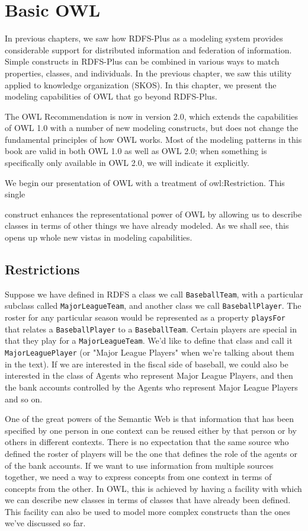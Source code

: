 \chapter{Basic OWL}
\label{ch12}

In previous chapters, we saw how RDFS-Plus as a modeling system provides
considerable support for distributed information and federation of
information. Simple constructs in RDFS-Plus can be combined in various
ways to match properties, classes, and individuals. In the previous
chapter, we saw this utility applied to knowledge organization (SKOS).
In this chapter, we present the modeling capabilities of OWL that go
beyond RDFS-Plus.

The OWL Recommendation is now in version 2.0, which extends the
capabilities of OWL 1.0 with a number of new modeling constructs, but
does not change the fundamental principles of how OWL works. Most of the
modeling patterns in this book are valid in both OWL 1.0 as well as OWL
2.0; when something is specifically only available in OWL 2.0, we will
indicate it explicitly.

We begin our presentation of OWL with a treatment of owl:Restriction.
This single

construct enhances the representational power of OWL by allowing us to
describe classes in terms of other things we have already modeled. As we
shall see, this opens up whole new vistas in modeling capabilities.

\section{Restrictions}

Suppose we have defined in RDFS a class we call \texttt{BaseballTeam}, with a
particular subclass called \texttt{MajorLeagueTeam}, and another class we call
\texttt{BaseballPlayer}. The roster for any particular season would be
represented as a property \texttt{playsFor} that relates a \texttt{BaseballPlayer} to a
\texttt{BaseballTeam}. Certain players are special in that they play for a
\texttt{MajorLeagueTeam}. We'd like to define that class and call it
\texttt{MajorLeaguePlayer} (or  "Major League Players"  when we're talking about them in the text). If we are interested in the fiscal side of baseball, we
could also be
interested in the class of Agents who represent Major League Players,
and then the bank accounts controlled by the Agents who represent Major
League Players and so on.

One of the great powers of the Semantic Web is that information that has
been specified by one person in one context can be reused either by that
person or by others in different contexts. There is no expectation that
the same source who defined the roster of players will be the one that
defines the role of the agents or of the bank accounts. If we want to
use information from multiple sources together, we need a way to express
concepts from one context in terms of concepts from the other. In OWL,
this is achieved by having a facility with which we can describe new
classes in terms of classes that have already been defined. This
facility can also be used to model more complex constructs than the ones
we've discussed so far.

